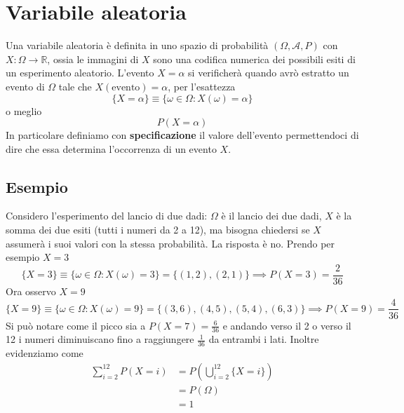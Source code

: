 \documentclass[11pt]{report}
\begin{document}
\section{Variabile aleatoria}
Una variabile aleatoria è definita in uno spazio di probabilità $(\Omega, \mathcal{A}, P)$ con $X : \Omega \rightarrow \mathbb{R}$, ossia le immagini di $X$ sono una codifica numerica dei possibili esiti di un esperimento aleatorio. L'evento $X = \alpha$ si verificherà quando avrò estratto un evento di $\Omega$ tale che $X(\text{evento}) = \alpha$, per l'esattezza
\begin{equation}
    \{X = \alpha\} \equiv \{\omega \in \Omega : X(\omega) = \alpha\}
\end{equation}
o meglio
\begin{equation}
    P(X = \alpha)
\end{equation}
In particolare definiamo con \textbf{specificazione} il valore dell'evento permettendoci di dire che essa determina l'occorrenza di un evento $X$.
\subsection{Esempio}
Considero l'esperimento del lancio di due dadi: $\Omega$ è il lancio dei due dadi, $X$ è la somma dei due esiti (tutti i numeri da 2 a 12), ma bisogna chiedersi se $X$ assumerà i suoi valori con la stessa probabilità. La risposta è no. Prendo per esempio $X=3$
\begin{equation}
    \{X=3\} \equiv \{\omega \in \Omega : X(\omega) = 3\} = \{(1,2), (2,1)\} \implies P(X=3) = \frac{2}{36}
\end{equation}
Ora osservo $X=9$
\begin{equation}
    \{X=9\} \equiv \{\omega \in \Omega : X(\omega) = 9\} = \{(3,6), (4,5), (5,4), (6,3)\} \implies P(X=9) = \frac{4}{36}
\end{equation}
Si può notare come il picco sia a $P(X=7) = \frac{6}{36}$ e andando verso il 2 o verso il 12 i numeri diminuiscano fino a raggiungere $\frac{1}{36}$ da entrambi i lati. Inoltre evidenziamo come
\begin{equation}
    \begin{split}
        \sum_{i=2}^{12}P(X=i) & = P\left(\bigcup_{i=2}^{12}\{X=i\}\right)\\
        & = P(\Omega)\\
        & = 1
    \end{split}
\end{equation}
\end{document}
